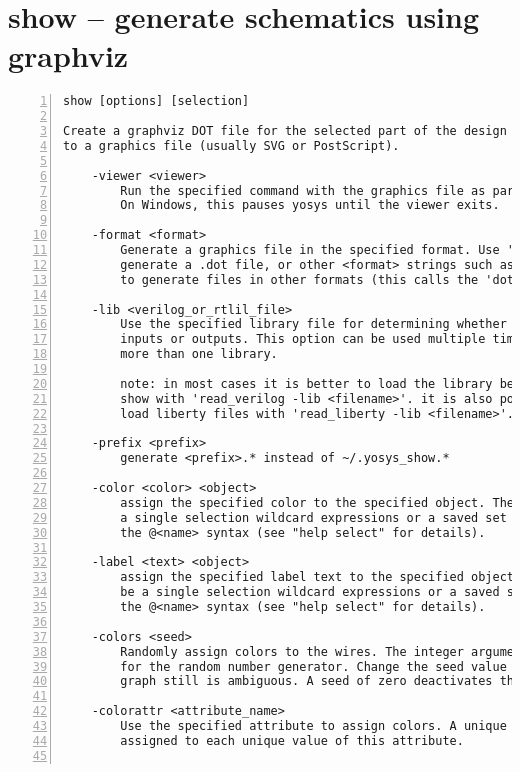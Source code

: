 \section{show -- generate schematics using graphviz}
\label{cmd:show}
\begin{lstlisting}[numbers=left,frame=single]
    show [options] [selection]

Create a graphviz DOT file for the selected part of the design and compile it
to a graphics file (usually SVG or PostScript).

    -viewer <viewer>
        Run the specified command with the graphics file as parameter.
        On Windows, this pauses yosys until the viewer exits.

    -format <format>
        Generate a graphics file in the specified format. Use 'dot' to just
        generate a .dot file, or other <format> strings such as 'svg' or 'ps'
        to generate files in other formats (this calls the 'dot' command).

    -lib <verilog_or_rtlil_file>
        Use the specified library file for determining whether cell ports are
        inputs or outputs. This option can be used multiple times to specify
        more than one library.

        note: in most cases it is better to load the library before calling
        show with 'read_verilog -lib <filename>'. it is also possible to
        load liberty files with 'read_liberty -lib <filename>'.

    -prefix <prefix>
        generate <prefix>.* instead of ~/.yosys_show.*

    -color <color> <object>
        assign the specified color to the specified object. The object can be
        a single selection wildcard expressions or a saved set of objects in
        the @<name> syntax (see "help select" for details).

    -label <text> <object>
        assign the specified label text to the specified object. The object can
        be a single selection wildcard expressions or a saved set of objects in
        the @<name> syntax (see "help select" for details).

    -colors <seed>
        Randomly assign colors to the wires. The integer argument is the seed
        for the random number generator. Change the seed value if the colored
        graph still is ambiguous. A seed of zero deactivates the coloring.

    -colorattr <attribute_name>
        Use the specified attribute to assign colors. A unique color is
        assigned to each unique value of this attribute.


\end{lstlisting}
